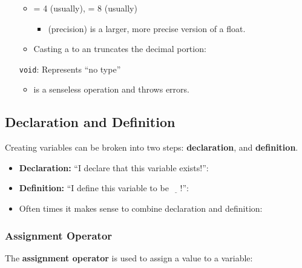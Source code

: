 \documentclass{article}
\begin{document}
\begin{itemize}
	\begin{itemize}
		\item {} = 4 (usually),  = 8 (usually)
		\begin{itemize}
			\item {} (precision) is a larger, more precise version of a float.
		\end{itemize}
		\item Casting a  to an  truncates the decimal portion:
	\end{itemize}
	\item[\textcolor{BurntOrange}{\texttt{void}}:] Represents ``no type''
	\begin{itemize}
		\item {} is a senseless operation and throws errors.
	\end{itemize} 
\end{itemize}

\subsection{Declaration and Definition}

\noindent
Creating variables can be broken into two steps: \textbf{declaration}, and \textbf{definition}.

\begin{itemize}
	\item \textbf{Declaration:} ``I declare that this variable exists!'':
	\item \textbf{Definition:} ``I define this variable to be $\underline{\quad}$!'':
	\item Often times it makes sense to combine declaration and definition:
\end{itemize}

\subsubsection{Assignment Operator \inlinecpp{=}}

\noindent
The \textbf{assignment operator} \inlinecpp{=} is used to assign a value to a variable:

\end{document}
